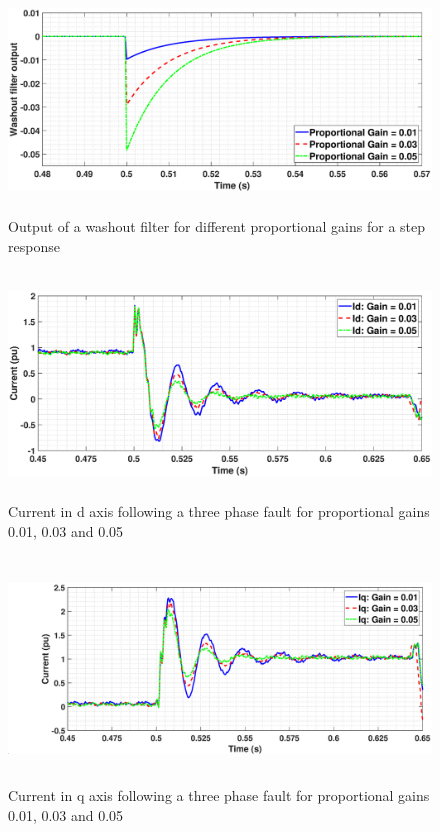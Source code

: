 \begin{figure}[H]
\centering
    \includegraphics[height = 6cm,width = 14.5cm]{Diagrams/Chapter_3/Washout_gain_output.eps}
    \caption{Output of a washout filter for different proportional gains for a step response}
    \label{fig:Washout_gain_output}
\end{figure}

\begin{figure}[H]
\centering
    \includegraphics[height = 6cm,width = 14.5cm]{Diagrams/Chapter_3/ID_Washout_Comp.eps}
    \caption{Current in d axis following a three phase fault for proportional gains 0.01, 0.03 and 0.05}
    \label{fig:ID_Washout_Comp}
\end{figure}

\begin{figure}[H]
\centering
    \includegraphics[height = 6cm,width = 14.5cm]{Diagrams/Chapter_3/IQ_Washout_Comp.eps}
    \caption{Current in q axis following a three phase fault for proportional gains 0.01, 0.03 and 0.05}
    \label{fig:IQ_Washout_Comp}
\end{figure}


